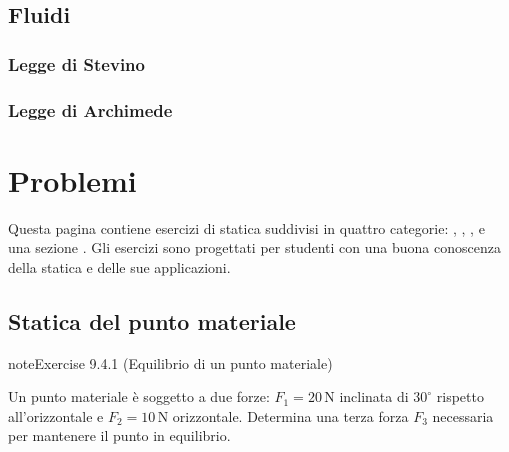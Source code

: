 \documentclass[letterpaper,10pt,italian]{jupyterBook}
\begin{document}
\subsection{Fluidi}
\label{\detokenize{ch/mechanics/statics-fluid:fluidi}}\label{\detokenize{ch/mechanics/statics-fluid:physics-hs-mechanics-statics-fluid-fluid}}

\subsubsection{Legge di Stevino}
\label{\detokenize{ch/mechanics/statics-fluid:legge-di-stevino}}\label{\detokenize{ch/mechanics/statics-fluid:physics-hs-mechanics-statics-fluid-stevino}}

\subsubsection{Legge di Archimede}
\label{\detokenize{ch/mechanics/statics-fluid:legge-di-archimede}}\label{\detokenize{ch/mechanics/statics-fluid:physics-hs-mechanics-statics-fluid-archimede}}
\sphinxstepscope


\section{Problemi}
\label{\detokenize{ch/mechanics/statics-problems:problemi}}\label{\detokenize{ch/mechanics/statics-problems:physics-hs-mechanics-statics-problems}}\label{\detokenize{ch/mechanics/statics-problems::doc}}
\sphinxAtStartPar
Questa pagina contiene esercizi di statica suddivisi in quattro categorie: , , , e una sezione . Gli esercizi sono progettati per studenti con una buona conoscenza della statica e delle sue applicazioni.


\subsection{Statica del punto materiale}
\label{\detokenize{ch/mechanics/statics-problems:statica-del-punto-materiale}} \label{exercise:ch/mechanics/statics-problems-exercise-0}

\begin{sphinxadmonition}{note}{Exercise 9.4.1 (Equilibrio di un punto materiale)}



\sphinxAtStartPar
Un punto materiale è soggetto a due forze: \(F_1 = 20 \, \text{N}\) inclinata di \(30^\circ\) rispetto all’orizzontale e \(F_2 = 10 \, \text{N}\) orizzontale. Determina una terza forza \(F_3\) necessaria per mantenere il punto in equilibrio.
\end{sphinxadmonition}
 \label{exercise:ch/mechanics/statics-problems-exercise-1}
\end{document}
